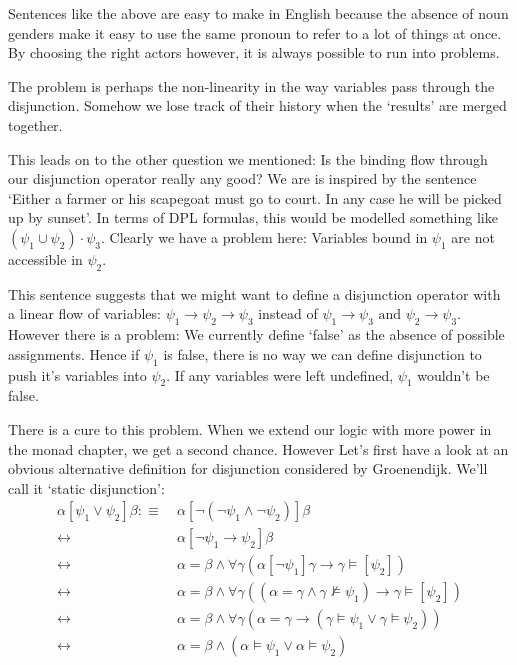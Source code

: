 \documentclass[12pt]{article}
\begin{document}
Sentences like the above are easy to make in English because the absence of noun genders make it easy to use the same pronoun to refer to a lot of things at once. By choosing the right actors however, it is always possible to run into problems.

The problem is perhaps the non-linearity in the way variables pass through the disjunction. Somehow we lose track of their history when the `results' are merged together.

This leads on to the other question we mentioned: Is the binding flow through our disjunction operator really any good? We are is inspired by the sentence `Either a farmer or his scapegoat must go to court. In any case he will be picked up by sunset'. In terms of DPL formulas, this would be modelled something like $(\psi_1\cup\psi_2)\cdot\psi_3$. Clearly we have a problem here: Variables bound in $\psi_1$ are not accessible in $\psi_2$.

This sentence suggests that we might want to define a disjunction operator with a linear flow of variables: $\psi_1\to\psi_2\to\psi_3$ instead of $\psi_1\to\psi_3\text{ and }\psi_2\to\psi_3$. However there is a problem: We currently define `false' as the absence of possible assignments. Hence if $\psi_1$ is false, there is no way we can define disjunction to push it's variables into $\psi_2$. If any variables were left undefined, $\psi_1$ wouldn't be false.

There is a cure to this problem. When we extend our logic with more power in the monad chapter, we get a second chance. However Let's first have a look at an obvious alternative definition for disjunction considered by Groenendijk\cite{groenendijk1991dynamic}. We'll call it `static disjunction':
\begin{align}
\alpha[\psi_1\vee\psi_2]\beta
 :\equiv&\ \alpha[\neg(\neg\psi_1\wedge\neg\psi_2)]\beta \nonumber\\
 \leftrightarrow&\ \alpha[\neg\psi_1\rightarrow\psi_2]\beta \nonumber\\
 \leftrightarrow&\ \alpha = \beta \wedge \forall\gamma(\alpha[\neg\psi_1]\gamma\rightarrow\gamma\models[\psi_2]) \nonumber\\
 \leftrightarrow&\ \alpha = \beta \wedge \forall\gamma((\alpha=\gamma\wedge\gamma\not\models\psi_1)\rightarrow\gamma\models[\psi_2]) \nonumber\\
 \leftrightarrow&\ \alpha = \beta \wedge \forall\gamma(\alpha=\gamma\rightarrow(\gamma\models\psi_1\vee\gamma\models\psi_2)) \nonumber\\
 \leftrightarrow&\ \alpha = \beta \wedge (\alpha\models\psi_1\vee\alpha\models\psi_2) \label{sem_or}
\end{align}
\end{document}
